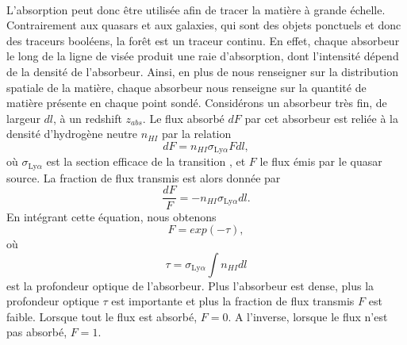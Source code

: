 \documentclass[11pt, twoside, a4paper, openright]{report}
\begin{document}
\paragraph{}
L'absorption \lya{} peut donc être utilisée afin de tracer la matière à grande échelle. Contrairement aux quasars et aux galaxies, qui sont des objets ponctuels et donc des traceurs booléens, la forêt \lya{} est un traceur continu. En effet, chaque absorbeur le long de la ligne de visée produit une raie d'absorption, dont l'intensité dépend de la densité de l'absorbeur. Ainsi, en plus de nous renseigner sur la distribution spatiale de la matière, chaque absorbeur nous renseigne sur la quantité de matière présente en chaque point sondé.
Considérons un absorbeur très fin, de largeur $dl$, à un redshift $z_{abs}$. Le flux absorbé $dF$ par cet absorbeur est reliée à la densité d'hydrogène neutre $n_{HI}$ par la relation
\begin{equation}
  dF = n_{HI} \sigma_{\mathrm{Ly}\alpha} F dl ,
\end{equation}
où $\sigma_{\mathrm{Ly}\alpha}$ est la section efficace de la transition \lya{}, et $F$ le flux émis par le quasar source.
La fraction de flux transmis est alors donnée par
\begin{equation}
 \frac{dF}{F} = - n_{HI} \sigma_{\mathrm{Ly}\alpha} dl .
\end{equation}
En intégrant cette équation, nous obtenons
\begin{equation}
  \label{eq:tff}
  F = exp(- \tau),
\end{equation}
où
\begin{equation}
  \label{eq:tau}
  \tau = \sigma_{\mathrm{Ly}\alpha} \int n_{HI}   dl
\end{equation}
est la profondeur optique de l'absorbeur. Plus l'absorbeur est dense, plus la profondeur optique $\tau$ est importante et plus la fraction de flux transmis $F$ est faible. Lorsque tout le flux est absorbé, $F = 0$. A l'inverse, lorsque le flux n'est pas absorbé, $F = 1$.
\end{document}
